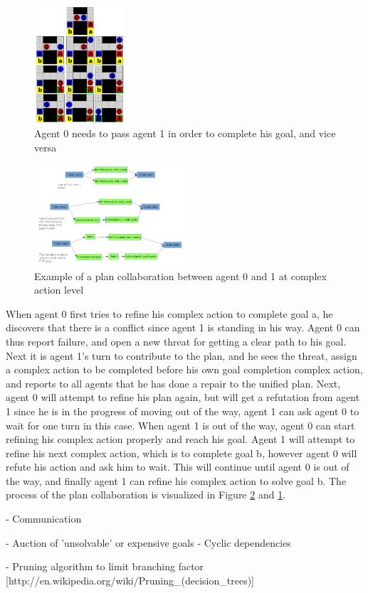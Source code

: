 \documentclass[Main]{subfiles}
\begin{document}
\begin{figure}[h!]
	\centering
	\includegraphics[width=0.3\textwidth]{plan_collab.png}
	\caption{Agent 0 needs to pass agent 1 in order to complete his goal, and vice versa}
	\label{fig:plan_collab}
\end{figure}

\begin{figure}[h!]
	\centering
	\includegraphics[width=0.5\textwidth]{unhtnpop.png}
	\caption{Example of a plan collaboration between agent 0 and 1 at complex action level}
	\label{fig:htn_collab}
\end{figure}


When agent 0 first tries to refine his complex action to complete goal a, he discovers that there is a conflict since agent 1 is standing in his way. Agent 0 can thus report failure, and open a new threat for getting a clear path to his goal. Next it is agent 1's turn to contribute to the plan, and he sees the threat, assign a complex action to be completed before his own goal completion complex action, and reports to all agents that he has done a repair to the unified plan. Next, agent 0 will attempt to refine his plan again, but will get a refutation from agent 1 since he is in the progress of moving out of the way, agent 1 can ask agent 0 to wait for one turn in this case. When agent 1 is out of the way, agent 0 can start refining his complex action properly and reach his goal. Agent 1 will attempt to refine his next complex action, which is to complete goal b, however agent 0 will refute his action and ask him to wait. This will continue until agent 0 is out of the way, and finally agent 1 can refine his complex action to solve goal b.
The process of the plan collaboration is visualized in Figure \ref{fig:htn_collab} and \ref{fig:plan_collab}.

- Communication

- Auction of 'unsolvable' or expensive goals \cite{VanderKrogt2005}
  - Cyclic dependencies 


- Pruning algorithm to limit branching factor [http://en.wikipedia.org/wiki/Pruning\_(decision\_trees)]
\end{document}
